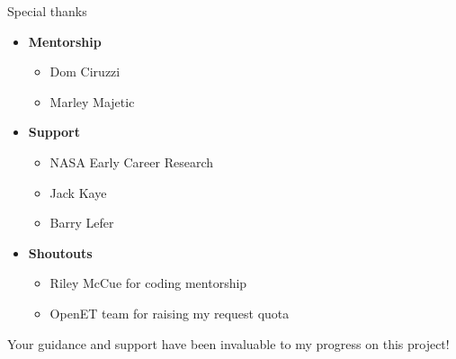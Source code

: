 \documentclass[aspectratio=169]{beamer}
\begin{document}
\begin{frame}{Special thanks}
    \centering
    \large
    
    \begin{itemize}
        \item \textbf{Mentorship}
        \begin{itemize}
            \item[] Dom Ciruzzi
            \item[] Marley Majetic
        \end{itemize}
        
        \vspace{0.5cm}
        
        \item \textbf{Support}
        \begin{itemize}
            \item[] NASA Early Career Research
            \item[] Jack Kaye 
            \item[] Barry Lefer
        \end{itemize}

        \vspace{0.5cm}

    \item \textbf{Shoutouts}
        \begin{itemize}
            \item[] Riley McCue for coding mentorship
            \item[] OpenET team for raising my request quota
        \end{itemize}
    \end{itemize}

    \vspace{0.5em}
    \large{
    Your guidance and support have been invaluable to my progress on this project!
    }
\end{frame}
\end{document}
